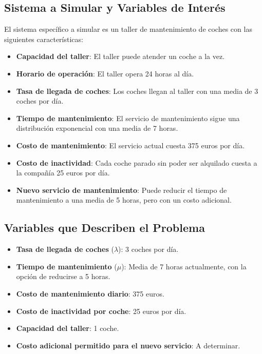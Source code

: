 \documentclass[a4paper,12pt]{article}
\begin{document}
    \subsection{Sistema a Simular y Variables de Interés}\label{subsec:sistema-a-simular-y-variables-de-interes}
    El sistema específico a simular es un taller de mantenimiento de coches con las siguientes características:
    \begin{itemize}
        \item \textbf{Capacidad del taller}: El taller puede atender un coche a la vez.
        \item \textbf{Horario de operación}: El taller opera 24 horas al día.
        \item \textbf{Tasa de llegada de coches}: Los coches llegan al taller con una media de 3 coches por día.
        \item \textbf{Tiempo de mantenimiento}: El servicio de mantenimiento sigue una distribución exponencial con una media de 7 horas.
        \item \textbf{Costo de mantenimiento}: El servicio actual cuesta 375 euros por día.
        \item \textbf{Costo de inactividad}: Cada coche parado sin poder ser alquilado cuesta a la compañía 25 euros por día.
        \item \textbf{Nuevo servicio de mantenimiento}: Puede reducir el tiempo de mantenimiento a una media de 5 horas, pero con un costo adicional.
    \end{itemize}

    \subsection{Variables que Describen el Problema}\label{subsec:variables-que-describen-el-problema}
    \begin{itemize}
        \item \textbf{Tasa de llegada de coches} ($\lambda$): 3 coches por día.
        \item \textbf{Tiempo de mantenimiento} ($\mu$): Media de 7 horas actualmente, con la opción de reducirse a 5 horas.
        \item \textbf{Costo de mantenimiento diario}: 375 euros.
        \item \textbf{Costo de inactividad por coche}: 25 euros por día.
        \item \textbf{Capacidad del taller}: 1 coche.
        \item \textbf{Costo adicional permitido para el nuevo servicio}: A determinar.
    \end{itemize}
\end{document}
